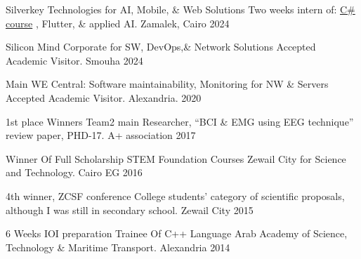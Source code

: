 


\begin{cvhonors}
  \cvhonor
    {Silverkey Technologies for AI, Mobile, \& Web Solutions} %
    {Two weeks intern of: {\textcolor{cyan}{\href{https://github.com/AsmaaJAH/Foundational-Csharp-with-Microsoft/tree/main}{C\# course}}} , Flutter, \& applied AI.} %
    {Zamalek, Cairo} %
    {2024} %

  \cvhonor
    {Silicon Mind Corporate for SW, DevOps,\& Network Solutions} %
    {Accepted Academic Visitor.} %
    {Smouha} %
    {2024} %


  \cvhonor
    {Main WE Central: Software maintainability, Monitoring for NW \& Servers} %
    {Accepted Academic Visitor.} %
    { Alexandria.} %
    {2020} %


  \cvhonor
    { 1st place Winners} %
    {Team2 main Researcher, “BCI \& EMG using EEG technique” review paper, PHD-17.} %
    {A+ association} %
    {2017} %


  \cvhonor
  {Winner Of Full Scholarship STEM Foundation Courses } %
  {Zewail City for Science and Technology.} %
  {Cairo EG} %
  {2016} %

  \cvhonor
  {4th winner, ZCSF conference } %
  {\scriptsize College students’ category of scientific proposals, although I was still in secondary school.} %
  {Zewail City} %
  {2015} %


    \cvhonor
      {6 Weeks IOI preparation Trainee Of C++ Language} %
      {Arab Academy of Science, Technology \& Maritime Transport.} %
      {Alexandria} %
      {2014} %
\end{cvhonors}